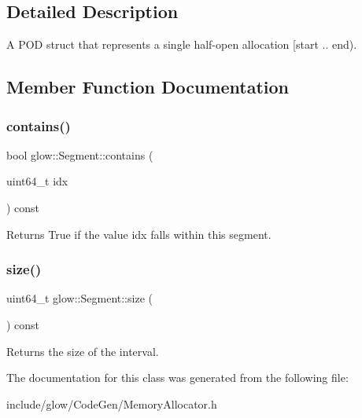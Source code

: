 \subsection{Detailed Description}
A P\+OD struct that represents a single half-\/open allocation \mbox{[}start .. end). 

\subsection{Member Function Documentation}
\mbox{\label{classglow_1_1_segment_a11d0f8ff343b8691d7f8086b4078868a}} 
\subsubsection{\texorpdfstring{contains()}{contains()}}
{\footnotesize\ttfamily bool glow\+::\+Segment\+::contains (\begin{DoxyParamCaption}\item[{uint64\+\_\+t}]{idx }\end{DoxyParamCaption}) const\hspace{0.3cm}{\ttfamily [inline]}}

\begin{DoxyReturn}{Returns}
True if the value {\ttfamily idx} falls within this segment. 
\end{DoxyReturn}
\mbox{\label{classglow_1_1_segment_ae8a61cbc6362e27e4b9e58da5f762f7b}} 
\subsubsection{\texorpdfstring{size()}{size()}}
{\footnotesize\ttfamily uint64\+\_\+t glow\+::\+Segment\+::size (\begin{DoxyParamCaption}{ }\end{DoxyParamCaption}) const\hspace{0.3cm}{\ttfamily [inline]}}

\begin{DoxyReturn}{Returns}
the size of the interval. 
\end{DoxyReturn}


The documentation for this class was generated from the following file\+:\begin{DoxyCompactItemize}
\item 
include/glow/\+Code\+Gen/Memory\+Allocator.\+h\end{DoxyCompactItemize}
